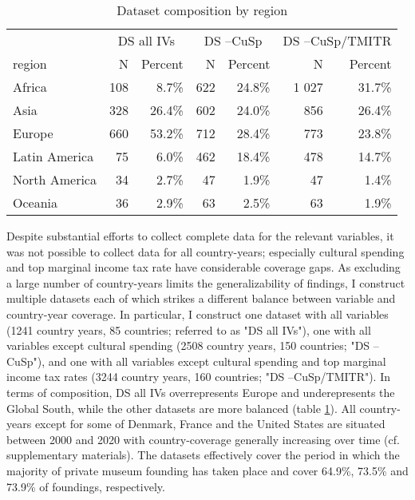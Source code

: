 \documentclass[11pt]{article}
\begin{document}
\begin{table}[ht]
\centering
\begin{tabular}{p{2.5cm}rrrrrr}
  \hline 
 & \multicolumn{2}{c}{DS all IVs} & \multicolumn{2}{c}{DS --CuSp} & \multicolumn{2}{c}{DS --CuSp/TMITR} \\ 
\cmidrule(r){2-3}\cmidrule(r){4-5}\cmidrule(r){6-7} 
 region & N & Percent & N & Percent & N & Percent \\ 
  \hline
Africa & 108 &  8.7\% & 622 & 24.8\% & 1 027 & 31.7\% \\ 
  Asia & 328 & 26.4\% & 602 & 24.0\% & 856 & 26.4\% \\ 
  Europe & 660 & 53.2\% & 712 & 28.4\% & 773 & 23.8\% \\ 
  Latin America & 75 &  6.0\% & 462 & 18.4\% & 478 & 14.7\% \\ 
  North America & 34 &  2.7\% & 47 &  1.9\% & 47 &  1.4\% \\ 
  Oceania & 36 &  2.9\% & 63 &  2.5\% & 63 &  1.9\% \\ 
   \hline
\end{tabular}
\caption{Dataset composition by region} 
\label{tbl:cbn_cpsgn}
\end{table}
Despite substantial efforts to collect complete data for the relevant variables, it was not possible to collect data for all country-years; especially cultural spending and top marginal income tax rate have considerable coverage gaps.
As excluding a large number of country-years limits the generalizability of findings, I construct multiple datasets each of which strikes a different balance between variable and country-year coverage.
In particular, I construct one dataset with all variables (1241 country years, 85 countries; referred to as "DS all IVs"), one with all variables except cultural spending (2508 country years, 150 countries; "DS --CuSp"), and one with all variables except cultural spending and top marginal income tax rates (3244 country years, 160 countries; "DS --CuSp/TMITR").
In terms of composition, DS all IVs overrepresents Europe and underepresents the Global South, while the other datasets are more balanced (table \ref{tbl:cbn_cpsgn}).
All country-years except for some of Denmark, France and the United States are situated between 2000 and 2020 with country-coverage generally increasing over time (cf. supplementary materials).
The datasets effectively cover the period in which the majority of private museum founding has taken place and cover 64.9\%, 73.5\% and 73.9\% of foundings, respectively.
\end{document}
